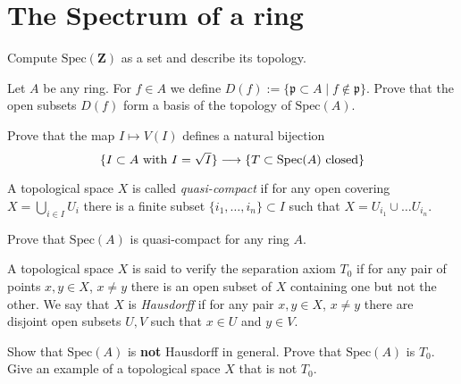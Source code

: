 \section{The Spectrum of a ring}
\label{section-spectrum-ring}

\begin{exercise}
\label{exercise-spec-Z}
Compute $\text{Spec}(\mathbf{Z})$ as a set and describe its topology.
\end{exercise}

\begin{exercise}
\label{exercise-basis-opens-standard}
Let $A$ be any ring. For $f\in A$ we define
$D(f):= \{\mathfrak p \subset A \mid f \not \in \mathfrak p\}$.
Prove that the open subsets $D(f)$ form a basis of the topology of
$\text{Spec}(A)$.
\end{exercise}

\begin{exercise}
\label{exercise-radical-ideals-closed}
Prove that the map $I\mapsto V(I)$
defines a natural bijection
$$
\{\hbox{$I\subset A$ with $I = \sqrt{I}$}\}
\longrightarrow
\{\hbox{$T\subset \text{Spec}(A)$ closed}\}
$$
\end{exercise}

\begin{definition}
\label{definition-quasi-compact}
A topological space $X$ is called {\it quasi-compact}
if for any open covering $X = \bigcup_{i\in I} U_i$ there is a finite
subset $\{i_1, \ldots, i_n\}\subset I$ such that $X = U_{i_1}\cup\ldots
U_{i_n}$.
\end{definition}

\begin{exercise}
\label{exercise-spec-quasi-compact}
Prove that $\text{Spec}(A)$ is quasi-compact for any ring $A$.
\end{exercise}

\begin{definition}
\label{definition-Hausdorff}
A topological space $X$ is said to verify the separation axiom $T_0$
if for any pair of points $x, y\in X$, $x\not = y$ there is an open
subset of $X$ containing one but not the other.
We say that $X$ is {\it Hausdorff} if for any pair $x, y\in X$, $x\not = y$
there are disjoint open subsets $U, V$ such that $x\in U$
and $y\in V$.
\end{definition}

\begin{exercise}
\label{exercise-not-hausdorff}
Show that $\text{Spec}(A)$ is {\bf not} Hausdorff in general.
Prove that $\text{Spec}(A)$ is $T_0$. Give an example of a topological
space $X$ that is not $T_0$.
\end{exercise}

